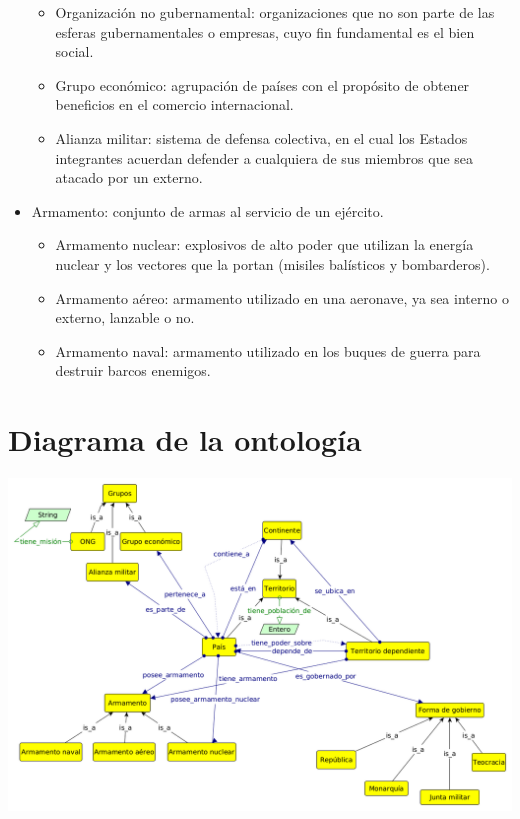 \documentclass[11pt]{article}
\begin{document}
\begin{itemize}
\begin{itemize}
        \item Organización no gubernamental: organizaciones que no son parte de las esferas gubernamentales o empresas, cuyo fin fundamental es el bien social.
        \item Grupo económico: agrupación de países con el propósito de obtener beneficios en el comercio internacional.
        \item Alianza militar: sistema de defensa colectiva, en el cual los Estados integrantes acuerdan defender a cualquiera de sus miembros que sea atacado por un externo. 
    \end{itemize}
    \item Armamento: conjunto de armas al servicio de un ejército. 
    \begin{itemize}
        \item Armamento nuclear: explosivos de alto poder que utilizan la energía nuclear y los vectores que la portan (misiles balísticos y bombarderos).
        \item Armamento aéreo: armamento utilizado en una aeronave, ya sea interno o externo, lanzable o no.
        \item Armamento naval: armamento utilizado en los buques de guerra para destruir barcos enemigos.
    \end{itemize}
\end{itemize}

\section{Diagrama de la ontología}

\hspace{-2cm}\includegraphics[scale=0.4]{ontologia.png}
\end{document}

